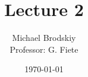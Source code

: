 


\title{Lecture 2}
\date{\today}
\author{Michael Brodskiy\\ \small Professor: G. Fiete}



\maketitle


